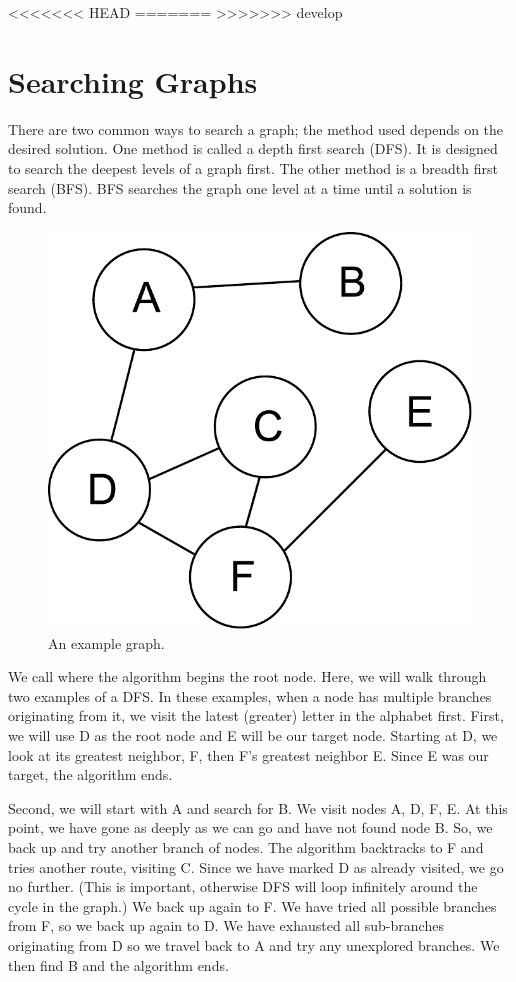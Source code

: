 \label{lab:SixDegreesKevinBacon}
<<<<<<< HEAD
=======
>>>>>>> develop

\section*{Searching Graphs}
There are two common ways to search a graph;
the method used depends on the desired solution.
One method is called a depth first search (DFS).  It is designed to search the deepest levels of a graph first.
The other method is a breadth first search (BFS).  BFS searches the graph one level at a time until a solution is found.
\begin{figure}[h]
\centering
\includegraphics[width=.5\textwidth]{graph.pdf}
\caption{An example graph.}
\label{fig:bfs_dfs_graph}
\end{figure}

We call where the algorithm begins the root node.
Here, we will walk through two examples of a DFS.
In these examples, when a node has multiple branches originating from it, we visit the latest (greater) letter in the alphabet first.
First, we will use D as the root node and E will be our target node.
Starting at D, we look at its greatest neighbor, F, then F's greatest neighbor E.
Since E was our target, the algorithm ends.

Second, we will start with A and search for B.
We visit nodes A, D, F, E.
At this point, we have gone as deeply as we can go and have not found node B.
So, we back up and try another branch of nodes.
The algorithm backtracks to F and tries another route, visiting C.
Since we have marked D as already visited, we go no further.
(This is important, otherwise DFS will loop infinitely around the cycle in the graph.)
We back up again to F.  We have tried all possible branches from F, so we back up again to D.
We have exhausted all sub-branches originating from D so we travel back to A and try any unexplored branches.
We then find B and the algorithm ends.


